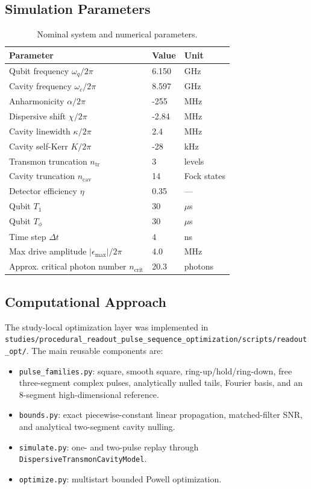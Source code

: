 \documentclass[11pt, a4paper]{article}
\begin{document}
\subsection{Simulation Parameters}
\begin{table}[H]
  \centering
  \caption{Nominal system and numerical parameters.}
  \begin{tabular}{@{} l l l @{}}
    \toprule
    Parameter & Value & Unit \\
    \midrule
    Qubit frequency $\omega_q/2\pi$ & 6.150 & GHz \\
    Cavity frequency $\omega_c/2\pi$ & 8.597 & GHz \\
    Anharmonicity $\alpha/2\pi$ & -255 & MHz \\
    Dispersive shift $\chi/2\pi$ & -2.84 & MHz \\
    Cavity linewidth $\kappa/2\pi$ & 2.4 & MHz \\
    Cavity self-Kerr $K/2\pi$ & -28 & kHz \\
    Transmon truncation $n_{\mathrm{tr}}$ & 3 & levels \\
    Cavity truncation $n_{\mathrm{cav}}$ & 14 & Fock states \\
    Detector efficiency $\eta$ & 0.35 & --- \\
    Qubit $T_1$ & 30 & $\mu$s \\
    Qubit $T_\phi$ & 30 & $\mu$s \\
    Time step $\Delta t$ & 4 & ns \\
    Max drive amplitude $|\epsilon_{\max}|/2\pi$ & 4.0 & MHz \\
    Approx. critical photon number $n_{\mathrm{crit}}$ & 20.3 & photons \\
    \bottomrule
  \end{tabular}
\end{table}

\subsection{Computational Approach}
The study-local optimization layer was implemented in
\texttt{studies/procedural\_readout\_pulse\_sequence\_optimization/scripts/readout\_opt/}.
The main reusable components are:
\begin{itemize}
  \item \texttt{pulse\_families.py}: square, smooth square, ring-up/hold/ring-down, free
  three-segment complex pulses, analytically nulled tails, Fourier basis, and an
  8-segment high-dimensional reference.
  \item \texttt{bounds.py}: exact piecewise-constant linear propagation, matched-filter
  SNR, and analytical two-segment cavity nulling.
  \item \texttt{simulate.py}: one- and two-pulse replay through
  \texttt{DispersiveTransmonCavityModel}.
  \item \texttt{optimize.py}: multistart bounded Powell optimization.
\end{itemize}
\end{document}
